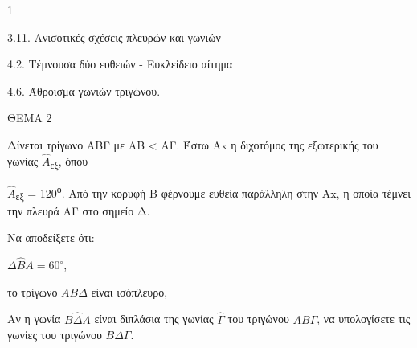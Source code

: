 \begin{ylh}{1}
    \item 3.11. Ανισοτικές σχέσεις πλευρών και γωνιών
    \item 4.2. Τέμνουσα δύο ευθειών - Ευκλείδειο αίτημα
    \item 4.6. Άθροισμα γωνιών τριγώνου.
\end{ylh}

ΘΕΜΑ 2

Δίνεται τρίγωνο ΑΒΓ με ΑΒ \textless{} ΑΓ. Έστω Αx η διχοτόμος της εξωτερικής του γωνίας $\widehat{Α}$\textsubscript{εξ}, όπου

$\widehat{Α}$\textsubscript{εξ} = 120\textsuperscript{ο}. Από την κορυφή Β φέρνουμε ευθεία παράλληλη στην Αx, η οποία τέμνει την πλευρά ΑΓ στο σημείο Δ.

\begin{alist}
\item Να αποδείξετε ότι:
\begin{rlist}
\item $\Delta\widehat{B}A = 60^{\circ}$, 
\item το τρίγωνο $AB\Delta$ είναι ισόπλευρο, 
\end{rlist}

\item Αν η γωνία $B\widehat{\Delta}A$ είναι διπλάσια της γωνίας $\widehat{\Gamma}$ του τριγώνου $AB\Gamma$, να υπολογίσετε τις γωνίες του τριγώνου $B\Delta\Gamma$. 

\begin{center}
\end{center}
\end{alist}
